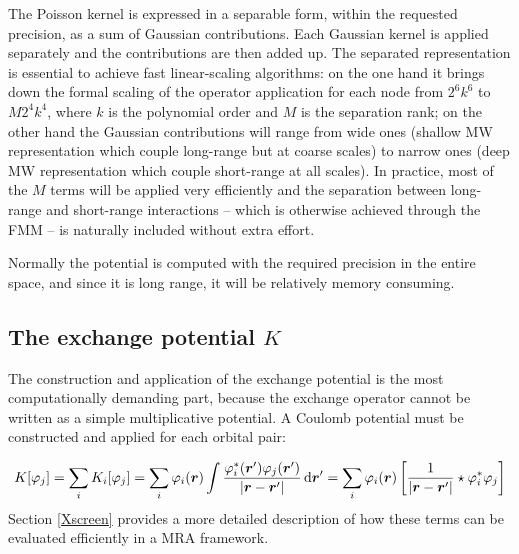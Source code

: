 \documentclass[journal=jctcce, manuscript=suppinfo]{achemso}
\begin{document}
The Poisson kernel is expressed in a separable form, within the requested precision, as a sum of Gaussian contributions.\cite{Beylkin.10.1016/j.acha.2005.01.003} Each Gaussian kernel is applied separately and the contributions are then added up. The separated representation is essential to achieve fast linear-scaling algorithms: on the one hand it brings down the formal scaling of the operator application for each node from $2^6 k^6$ to $M 2^4 k^4$, where $k$ is the polynomial order and $M$ is the separation rank; on the other hand the Gaussian contributions will range from wide ones (shallow \ac{MW} representation which couple long-range but at coarse scales) to narrow ones (deep \ac{MW} representation which couple short-range at all scales). In practice, most of the $M$ terms will be applied very efficiently and the separation between long-range and short-range interactions -- which is otherwise achieved through the \ac{FMM} -- is naturally included without extra effort.\cite{Frediani.10.1080/00268976.2013.810793, Beylkin.10.1016/j.acha.2007.01.001}

Normally the potential is computed with the required precision in the entire space, and since it is long range, it will be relatively memory consuming.

\subsection{The exchange potential $K$}\label{sec:compute-K}
The construction and application of the exchange potential is the most computationally demanding part, because the exchange operator cannot be written as a simple multiplicative potential. A Coulomb potential must be constructed and applied for each orbital pair:

\begin{equation}
  K[\varphi_j] = \sum_i K_i[\varphi_j] = 
  \sum_i \varphi_i(\boldsymbol{r}) \int \frac{\varphi^*_i(\boldsymbol{r}')\varphi_j(\boldsymbol{r}')}{|\boldsymbol{r}-\boldsymbol{r}'|} \, \mathrm{d}\boldsymbol{r}'
  =
  \sum_i \varphi_i(\boldsymbol{r}) \left[
  \frac{1}{|\boldsymbol{r}-\boldsymbol{r}'|} \star 
  \varphi^*_i\varphi_j
  \right]
\end{equation}
Section \ref{Xscreen} provides a more detailed description of how these terms can be evaluated efficiently in a \ac{MRA} framework. 
\end{document}
